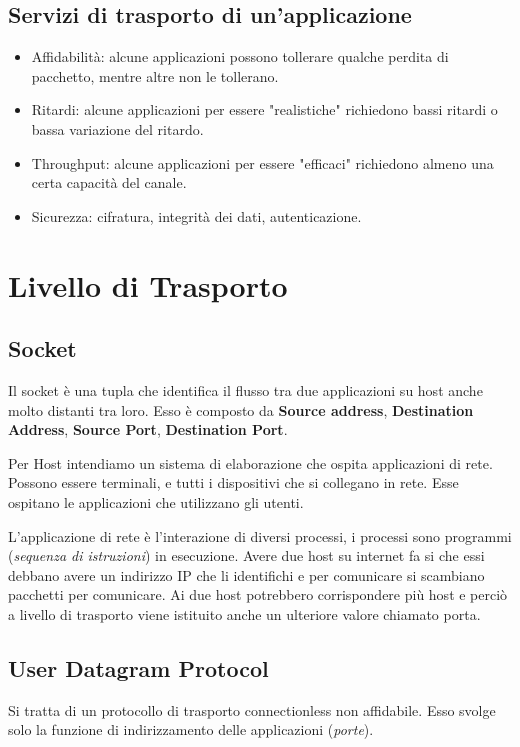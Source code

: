 \documentclass[oneside,a4paper,11pt]{book}
\theoremstyle{italicstyle}
\theoremstyle{normStyle}
\begin{document}
\subsection{Servizi di trasporto di un'applicazione}
\begin{itemize}
  \item Affidabilità: alcune applicazioni possono tollerare qualche perdita 
  di pacchetto, mentre altre non le tollerano.
  \item Ritardi: alcune applicazioni per essere "realistiche" richiedono bassi 
  ritardi o bassa variazione del ritardo.
  \item Throughput: alcune applicazioni per essere "efficaci" richiedono almeno una certa 
  capacità del canale.
  \item Sicurezza: cifratura, integrità dei dati, autenticazione.
\end{itemize}
\section{Livello di Trasporto}
\subsection{Socket}
Il socket è una tupla che identifica il flusso tra due
applicazioni su host anche molto distanti tra loro. Esso 
è composto da \textbf{Source address}, \textbf{Destination Address},
\textbf{Source Port}, \textbf{Destination Port}.

Per Host intendiamo un sistema di elaborazione che ospita
applicazioni di rete. Possono essere terminali, e tutti i
dispositivi che si collegano in rete. Esse ospitano le
applicazioni che utilizzano gli utenti.

L'applicazione di rete è l'interazione di diversi processi, i processi
sono programmi (\textit{sequenza di istruzioni}) in esecuzione.
Avere due host su internet fa si che essi debbano avere un indirizzo IP che li
identifichi e per comunicare si scambiano pacchetti per comunicare. Ai due host potrebbero
corrispondere più host e perciò a livello di trasporto viene istituito anche 
un ulteriore valore chiamato porta.

\subsection{User Datagram Protocol}
Si tratta di un protocollo di trasporto connectionless non affidabile. Esso
svolge solo la funzione di indirizzamento delle applicazioni (\textit{porte}).
\end{document}
